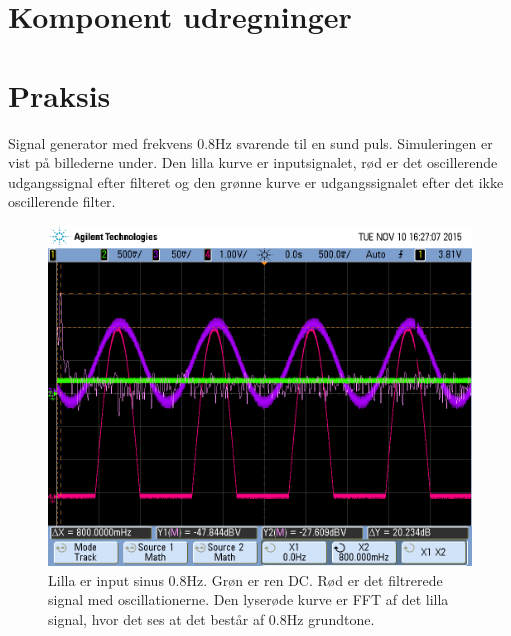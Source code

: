 \section{Komponent udregninger}


\section{Praksis}
Signal generator med frekvens 0.8Hz svarende til en sund puls. Simuleringen er vist på billederne under. Den lilla kurve er inputsignalet, rød er det oscillerende udgangssignal efter filteret og den grønne kurve er udgangssignalet efter det ikke oscillerende filter.

\begin{figure}[H]
	\includegraphics[width=\textwidth]{Implementeringsdokument/billeder/scope_9.png}
	\caption{Lilla er input sinus 0.8Hz. Grøn er ren DC. Rød er det filtrerede signal med oscillationerne. Den lyserøde kurve er FFT af det lilla signal, hvor det ses at det består af 0.8Hz grundtone.}\label{fig:filterone}
\end{figure}

